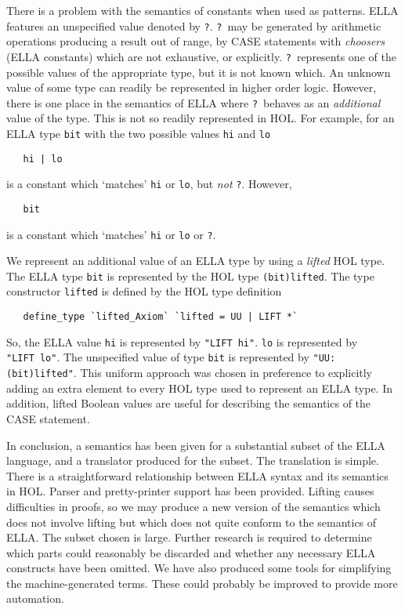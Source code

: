 There is a problem with the semantics of constants when used as patterns.
ELLA features an unspecified value denoted by {\tt ?}. {\tt ?}~may be
generated by arithmetic operations producing a result out of range, by CASE
statements with {\it choosers\/} (ELLA constants) which are not exhaustive,
or explicitly. {\tt ?}~represents one of the possible values of the
appropriate type, but it is not known which. An unknown value of some type can
readily be represented in higher order logic. However, there is one place in
the semantics of ELLA where {\tt ?}~behaves as an {\em additional\/} value of
the type. This is not so readily represented in HOL. For example, for an ELLA
type {\tt bit} with the two possible values {\tt hi} and {\tt lo}
\begin{verbatim}
   hi | lo
\end{verbatim}
is a constant which `matches' {\tt hi} or {\tt lo}, but {\em not\/} {\tt ?}.
However,
\begin{verbatim}
   bit
\end{verbatim}
is a constant which `matches' {\tt hi} or {\tt lo} or {\tt ?}.

We represent an additional value of an ELLA type by using a {\it lifted\/}
HOL type. The ELLA type {\tt bit} is represented by the HOL type
{\tt (bit)lifted}. The type constructor {\tt lifted} is defined by the HOL
type definition
\begin{verbatim}
   define_type `lifted_Axiom` `lifted = UU | LIFT *`
\end{verbatim}
So, the ELLA value {\tt hi} is represented by {\tt "LIFT~hi"}. {\tt lo} is
represented by {\tt "LIFT~lo"}. The unspecified value of type {\tt bit} is
represented by {\tt "UU:(bit)lifted"}. This uniform approach was chosen in
preference to explicitly adding an extra element to every HOL type used to
represent an ELLA type. In addition, lifted Boolean values are useful for
describing the semantics of the CASE statement.

In conclusion, a semantics has been given for a substantial subset of the ELLA
language, and a translator produced for the subset. The translation is simple.
There is a straightforward relationship between ELLA syntax and its semantics
in HOL. Parser and pretty-printer support has been provided. Lifting causes
difficulties in proofs, so we may produce a new version of the semantics which
does not involve lifting but which does not quite conform to the semantics of
ELLA. The subset chosen is large. Further research is required to determine
which parts could reasonably be discarded and whether any necessary ELLA
constructs have been omitted. We have also produced some tools for
simplifying the machine-generated terms. These could probably be improved to
provide more automation.

